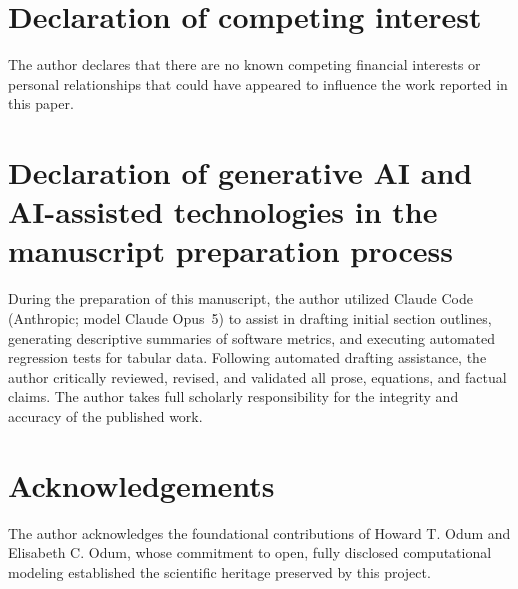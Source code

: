 \documentclass[3p,times,authoryear,twocolumn]{elsarticle}
\begin{document}
\section*{Declaration of competing interest}
The author declares that there are no known competing financial interests or personal relationships that could have appeared to influence the work reported in this paper.

\section*{Declaration of generative AI and AI-assisted technologies in the manuscript preparation process}
During the preparation of this manuscript, the author utilized Claude Code (Anthropic; model Claude Opus~5) to assist in drafting initial section outlines, generating descriptive summaries of software metrics, and executing automated regression tests for tabular data. Following automated drafting assistance, the author critically reviewed, revised, and validated all prose, equations, and factual claims. The author takes full scholarly responsibility for the integrity and accuracy of the published work.

\section*{Acknowledgements}
The author acknowledges the foundational contributions of Howard T. Odum and Elisabeth C. Odum, whose commitment to open, fully disclosed computational modeling established the scientific heritage preserved by this project.
\end{document}
